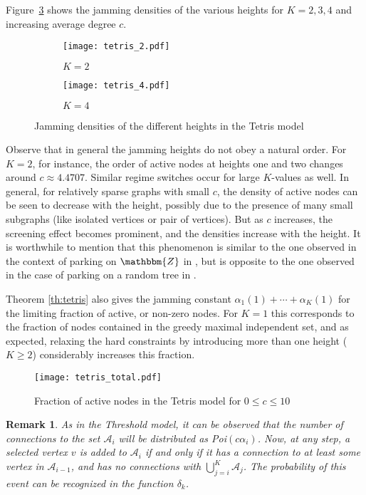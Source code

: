 \documentclass[11pt,a4paper, reqno]{article}
\newtheorem{remark}{Remark}
\begin{document}
Figure~\ref{fig:tetris-layer} shows the jamming densities of the various heights for $K=2,3,4$ and increasing average degree $c$. 
\begin{figure}
\begin{subfigure}{.5\textwidth}
  \centering
  \texttt{[image: tetris\_2.pdf]}
  \caption{$K=2$}
  \label{fig:sfig1}
\end{subfigure}\begin{subfigure}{.5\textwidth}
  \centering
  \texttt{[image: tetris\_4.pdf]}
  \caption{$K=4$}
  \label{fig:sfig3}
\end{subfigure}
\caption{Jamming densities of the different heights in the Tetris model}
\label{fig:tetris-layer}
\end{figure}
Observe that in general the jamming heights do not obey a natural order. 
For $K=2$, for instance, the order of active nodes at heights one and two changes around $c\approx 4.4707$. Similar regime switches occur for large $K$-values as well. In general, for relatively sparse graphs with small $c$, the density of active nodes can be seen to decrease with the height, possibly due to the presence of many small subgraphs (like isolated vertices or pair of vertices). But as $c$ increases, the screening effect becomes prominent, and the densities increase with the height. It is worthwhile to mention that this phenomenon is similar to the one observed  in the context of parking on ${\mathbbm{Z}}$ in \cite{FK09}, but is opposite to the one observed in the case of parking on a random tree in \cite{FK10}.

Theorem \ref{th:tetris} also gives the jamming constant $\alpha_1(1)+\cdots+\alpha_K(1)$ for the limiting fraction of active, or non-zero nodes.
For $K=1$ this corresponds to the fraction of nodes contained in the greedy maximal independent set, and as expected, relaxing the hard constraints by introducing more than one height ($K\geq 2$) considerably increases this fraction.
 
\begin{figure}
\begin{center}
\texttt{[image: tetris\_total.pdf]}
\end{center}
\caption{Fraction of active nodes in the Tetris model for $0\leq c\leq 10$}
\label{fig-tetr}
\end{figure}

\begin{remark}
\normalfont
As in the Threshold model, it can be observed that the number of connections to the set $\mathcal{A}_i$ will be distributed as Poi$(c\alpha_i)$. Now, at any step, a selected vertex $v$ is added to $\mathcal{A}_i$ if and only if it has a connection to at least some vertex in $\mathcal{A}_{i-1}$, and has no connections with $\bigcup_{j=i}^K\mathcal{A}_{j}$. The probability of this event can be recognized in the function $\delta_k$.
\end{remark}
\end{document}
